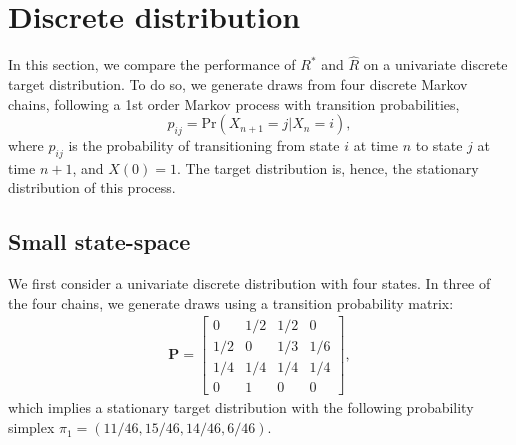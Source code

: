 \documentclass{article}
\begin{document}
\section{Discrete distribution}\label{sec:discrete}
In this section, we compare the performance of $R^*$ and $\widehat{R}$ on a univariate discrete target distribution. To do so, we generate draws from four discrete Markov chains, following a 1st order Markov process with transition probabilities,
%
\begin{equation}
p_{ij} = \text{Pr}(X_{n+1}=j|X_n=i),
\end{equation}
%
where $p_{ij}$ is the probability of transitioning from state $i$ at time $n$ to state $j$ at time $n+1$, and $X(0)=1$. The target distribution is, hence, the stationary distribution of this process.

\subsection{Small state-space}\label{sec:discrete_small}
We first consider a univariate discrete distribution with four states. In three of the four chains, we generate draws using a transition probability matrix:
%
\begin{gather}
\boldsymbol{P}
=
\begin{bmatrix}
0 & 1/2 & 1/2 & 0\\
1/2 & 0 & 1/3 & 1/6\\
1/4 & 1/4 & 1/4 & 1/4\\
0 & 1 & 0 & 0
\end{bmatrix},
\end{gather}
%
which implies a stationary target distribution with the following probability simplex $\pi_1 = (11/46, 15/46, 14/46, 6/46)$.
\end{document}
